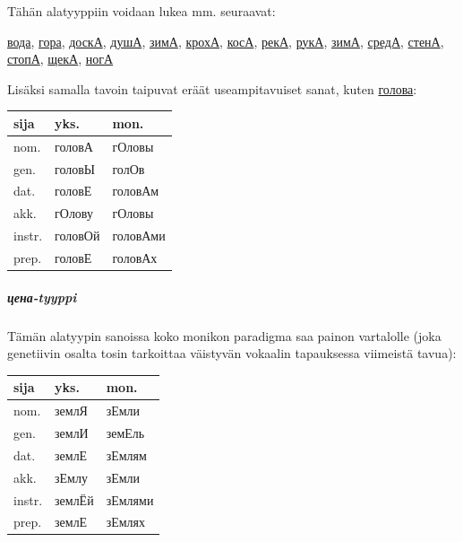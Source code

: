 \documentclass[]{scrartcl}
\begin{document}
Tähän alatyyppiin voidaan lukea mm. seuraavat:

\href{http://ru.wiktionary.org/wiki/\%D0\%B2\%D0\%BE\%D0\%B4\%D0\%B0}{вода},
\href{http://ru.wiktionary.org/wiki/\%D0\%B3\%D0\%BE\%D1\%80\%D0\%B0}{гора},
\href{http://ru.wiktionary.org/wiki/\%D0\%B4\%D0\%BE\%D1\%81\%D0\%BA\%D0\%B0}{доскА},
\href{http://ru.wiktionary.org/wiki/\%D0\%B4\%D1\%83\%D1\%88\%D0\%B0}{душА},
\href{http://ru.wiktionary.org/wiki/\%D0\%B7\%D0\%B8\%D0\%BC\%D0\%B0}{зимА},
\href{http://ru.wiktionary.org/wiki/\%D0\%BA\%D1\%80\%D0\%BE\%D1\%85\%D0\%B0}{крохА},
\href{http://ru.wiktionary.org/wiki/\%D0\%BA\%D0\%BE\%D1\%81\%D0\%B0}{косА},
\href{http://ru.wiktionary.org/wiki/\%D1\%80\%D0\%B5\%D0\%BA\%D0\%B0}{рекА},
\href{http://ru.wiktionary.org/wiki/\%D1\%80\%D1\%83\%D0\%BA\%D0\%B0}{рукА},
\href{http://ru.wiktionary.org/wiki/\%D0\%B7\%D0\%B8\%D0\%BC\%D0\%B0}{зимА},
\href{http://ru.wiktionary.org/wiki/\%D1\%81\%D1\%80\%D0\%B5\%D0\%B4\%D0\%B0}{средА},
\href{http://ru.wiktionary.org/wiki/\%D1\%81\%D1\%82\%D0\%B5\%D0\%BD\%D0\%B0}{стенА},
\href{http://ru.wiktionary.org/wiki/\%D1\%81\%D1\%82\%D0\%BE\%D0\%BF\%D0\%B0}{стопА},
\href{http://ru.wiktionary.org/wiki/\%D1\%89\%D0\%B5\%D0\%BA\%D0\%B0}{щекА},
\href{http://ru.wiktionary.org/wiki/\%D0\%BD\%D0\%BE\%D0\%B3\%D0\%B0}{ногА}

Lisäksi samalla tavoin taipuvat eräät useampitavuiset sanat, kuten
\href{http://ru.wiktionary.org/wiki/\%D0\%B3\%D0\%BE\%D0\%BB\%D0\%BE\%D0\%B2\%D0\%B0}{голова}:

\begin{longtable}[c]{@{}lll@{}}
\toprule
sija & yks. & mon.\tabularnewline
\midrule
\endhead
nom. & головА & гОловы\tabularnewline
gen. & головЫ & голОв\tabularnewline
dat. & головЕ & головАм\tabularnewline
akk. & гОлову & гОловы\tabularnewline
instr. & головОй & головАми\tabularnewline
prep. & головЕ & головАх\tabularnewline
\bottomrule
\end{longtable}

\subparagraph{цена-tyyppi}\label{ux446ux435ux43dux430-tyyppi}

Tämän alatyypin sanoissa koko monikon paradigma saa painon vartalolle
(joka genetiivin osalta tosin tarkoittaa väistyvän vokaalin tapauksessa
viimeistä tavua):

\begin{longtable}[c]{@{}lll@{}}
\toprule
sija & yks. & mon.\tabularnewline
\midrule
\endhead
nom. & землЯ & зЕмли\tabularnewline
gen. & землИ & земЕль\tabularnewline
dat. & землЕ & зЕмлям\tabularnewline
akk. & зЕмлу & зЕмли\tabularnewline
instr. & землЁй & зЕмлями\tabularnewline
prep. & землЕ & зЕмлях\tabularnewline
\bottomrule
\end{longtable}
\end{document}
